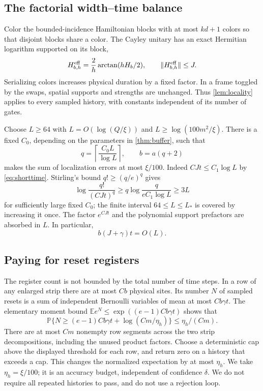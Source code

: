 \documentclass[11pt,reqno]{amsart}
\numberwithin{equation}{section}
\theoremstyle{definition}
\theoremstyle{remark}
\newcommand{\E}{\mathbb E}
\newcommand{\Prb}{\mathbb P}
\newcommand{\nn}[1]{\lVert#1\rVert}
\begin{document}
\subsection{The factorial width--time balance}
Color the bounded-incidence Hamiltonian blocks with at most $kd+1$ colors so that disjoint blocks share a color. The Cayley unitary has an exact Hermitian logarithm supported on its block,
\[
 H_{b,h}^{\rm eff}=\frac2h\arctan(hH_b/2),\qquad
 \nn{H_{b,h}^{\rm eff}}\leq J.
\]
Serializing colors increases physical duration by a fixed factor. In a frame toggled by the swaps, spatial supports and strengths are unchanged. Thus \cref{lem:locality} applies to every sampled history, with constants independent of its number of gates.

Choose $L\geq64$ with $L=O(\log(Q/\xi))$ and $L\geq\log(100m^2/\xi)$. There is a fixed $C_0$, depending on the parameters in \cref{thm:buffer}, such that
\begin{equation}\label{eq:width}
 q=\left\lceil\frac{C_0L}{\log L}\right\rceil,
 \qquad b=a(q+2)
\end{equation}
makes the sum of localization errors at most $\xi/100$. Indeed $CJt\leq C_1\log L$ by \eqref{eq:shorttime}. Stirling's bound $q!\geq(q/e)^q$ gives
\[
 \log\frac{q!}{(CJt)^q}
 \geq q\log\frac q{eC_1\log L}\geq 3L
\]
for sufficiently large fixed $C_0$; the finite interval $64\leq L\leq L_*$ is covered by increasing it once. The factor $e^{CJt}$ and the polynomial support prefactors are absorbed in $L$. In particular,
\begin{equation}\label{eq:balance}
 b(J+\gamma)t=O(L).
\end{equation}

\subsection{Paying for reset registers}
The register count is not bounded by the total number of time steps. In a row of any enlarged strip there are at most $Cb$ physical sites. Its number $N$ of sampled resets is a sum of independent Bernoulli variables of mean at most $Cb\gamma t$. The elementary moment bound
$\E e^N\leq\exp((e-1)Cb\gamma t)$ shows that
\[
 \Prb\{N\geq(e-1)Cb\gamma t+\log(Cm/\eta_h)\}
 \leq\eta_h/(Cm).
\]
There are at most $Cm$ nonempty row segments across the two strip decompositions, including the unused product factors. Choose a deterministic cap above the displayed threshold for each row, and return zero on a history that exceeds a cap. This changes the normalized expectation by at most $\eta_h$. We take $\eta_h=\xi/100$; it is an accuracy budget, independent of confidence $\delta$. We do not require all repeated histories to pass, and do not use a rejection loop.
\end{document}
